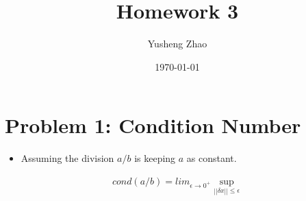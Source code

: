 \documentclass[11pt]{article}
\author{Yusheng Zhao}
\date{\today}
\title{Homework 3}
\begin{document}
\maketitle
\tableofcontents


\section{Problem 1: Condition Number}
\label{sec:org6112ada}
\begin{itemize}
\item Assuming the division \(a/b\) is keeping \(a\) as constant.
\end{itemize}
\begin{align}
    cond(a/b) = lim_{\epsilon \to 0^{+}} \sup_{||\delta x|| \le \epsilon}
\end{align}
\end{document}
